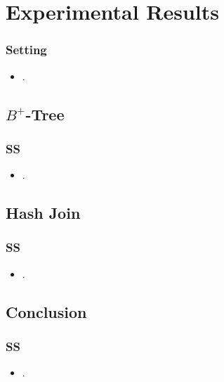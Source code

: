 \section{Experimental Results}

\begin{frame}
\frametitle{Setting} %

\begin{itemize}
\item .
\end{itemize}

\end{frame}

\subsection{$B^+$-Tree}

\begin{frame}
\frametitle{SS}

\begin{itemize}
\item .
\end{itemize}

\end{frame}
\subsection{Hash Join}

\begin{frame}
\frametitle{SS}

\begin{itemize}
\item .
\end{itemize}

\end{frame}



\subsection{Conclusion}

\begin{frame}
\frametitle{SS}

\begin{itemize}
\item .
\end{itemize}

\end{frame}
